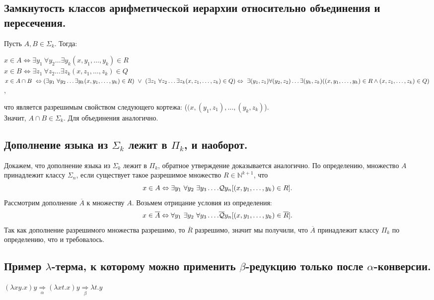 \subsection{Замкнутость классов арифметической иерархии относительно объединения и пересечения.}
Пусть $A,B \in \Sigma_k$. Тогда:
\begin{center}
    $x \in A \Leftrightarrow \exists y_1\ \forall y_2 \ldots \exists y_k (x,y_1,\ldots,y_k) \in R$ \\
    $x \in B \Leftrightarrow \exists z_1\ \forall z_2 \ldots \exists z_k (x,z_1,\ldots,z_k) \in Q$
    \\
    $x \in A \cap B \ \lra (\exists y_1\ \forall y_2 \ldots \exists y_k (x,y_1,\ldots,y_k) \in R) \ \vee \ (\exists z_1\ \forall z_2 \ldots \exists z_k (x,z_1,\ldots,z_k) \in Q)  \lra \ \exists(y_1,z_1) \forall (y_2,z_2) \ldots \exists(y_k,z_k)((x,y_1,\ldots,y_k) \in R \wedge (x,z_1,\ldots,z_k) \in Q)$,
\end{center}
что является разрешимым свойством следующего кортежа: ($(x,(y_1,z_1),\ldots,(y_k,z_k)$).\\ Значит, $A \cap B \in \Sigma_k$. Для объединения аналогично.

\subsection{Дополнение языка из $\Sigma_{k}$ лежит в $\Pi_{k}$, и наоборот.}

Докажем, что дополнение языка из $\Sigma_{k}$ лежит в $\Pi_{k}$, обратное утверждение доказывается аналогично. По определению, множество $A $ принадлежит классу $\Sigma_n$, если существует такое разрешимое множество $R \in \mathbb{N}^{k+1}$, что
$$x \in A \Leftrightarrow \exists y_1 \ \forall y_2 \ \exists y_3 \ldots. \mathcal{Q} y_n [(x, y_1,\ldots,y_k) \in R].$$
Рассмотрим дополнение $\overline{A}$ к множеству $A$. Возьмем отрицание условия из определения:
$$ x \in \overline{A} \Leftrightarrow \forall y_1 \ \exists y_2 \ \forall y_3 \ldots. \overline{\mathcal{Q}} y_n [(x, y_1,\ldots,y_k) \in \overline{R}].$$
Так как дополнение разрешимого множества разрешимо, то $\overline{R}$ разрешимо, значит мы получили, что $\overline{A}$ принадлежит классу $\Pi_{k}$ по определению, что и требовалось.

\subsection{Пример $\lambda$-терма, к которому можно применить $\beta$-редукцию только после $\alpha$-конверсии.}
$(\lambda xy.x)y \underset{\alpha}{\Rightarrow}(\lambda xt.x)y \underset{\beta}{\Rightarrow}\lambda t.y$

